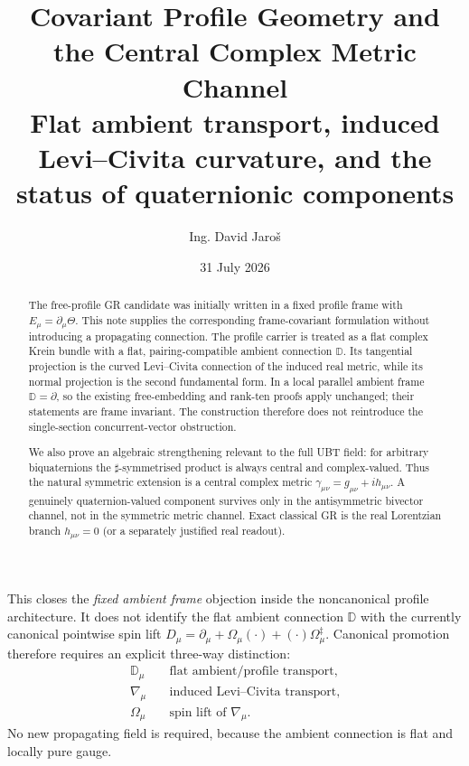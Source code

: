 \documentclass[11pt,a4paper]{article}
\title{Covariant Profile Geometry and the Central Complex Metric Channel\\
\large Flat ambient transport, induced Levi--Civita curvature, and the status of quaternionic components}
\author{Ing. David Jaro\v{s}}
\date{31 July 2026}
\theoremstyle{remark}
\newcommand{\Db}{\mathbb D}
\begin{document}
\maketitle

\begin{abstract}
The free-profile GR candidate was initially written in a fixed profile frame
with $E_\mu=\partial_\mu\Theta$.  This note supplies the corresponding
frame-covariant formulation without introducing a propagating connection.
The profile carrier is treated as a flat complex Krein bundle with a flat,
pairing-compatible ambient connection $\Db$.  Its tangential projection is the
curved Levi--Civita connection of the induced real metric, while its normal
projection is the second fundamental form.  In a local parallel ambient frame
$\Db=\partial$, so the existing free-embedding and rank-ten proofs apply
unchanged; their statements are frame invariant.  The construction therefore
does not reintroduce the single-section concurrent-vector obstruction.

We also prove an algebraic strengthening relevant to the full UBT field: for
arbitrary biquaternions the $\sharp$-symmetrised product is always central and
complex-valued.  Thus the natural symmetric extension is a central complex
metric $\gamma_{\mu\nu}=g_{\mu\nu}+ih_{\mu\nu}$.  A genuinely quaternion-valued
component survives only in the antisymmetric bivector channel, not in the
symmetric metric channel.  Exact classical GR is the real Lorentzian branch
$h_{\mu\nu}=0$ (or a separately justified real readout).
\end{abstract}

\begin{tcolorbox}[colback=yellow!5,colframe=yellow!55!black,title=Canonical status]
This closes the \emph{fixed ambient frame} objection inside the noncanonical
profile architecture.  It does not identify the flat ambient connection
$\Db$ with the currently canonical pointwise spin lift $D_\mu=\partial_\mu+
\Omega_\mu(\cdot)+(\cdot)\Omega_\mu^\ddagger$.  Canonical promotion therefore
requires an explicit three-way distinction:
\begin{align*}
 \Db_\mu&\quad\text{flat ambient/profile transport},\\
 \nabla_\mu&\quad\text{induced Levi--Civita transport},\\
 \Omega_\mu&\quad\text{spin lift of }\nabla_\mu.
\end{align*}
No new propagating field is required, because the ambient connection is flat
and locally pure gauge.
\end{tcolorbox}
\end{document}
